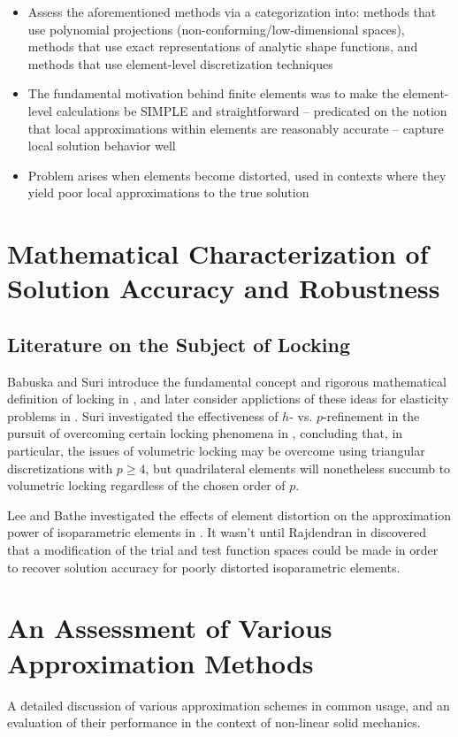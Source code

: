 \begin{itemize}
\begin{itemize}
	\end{itemize}
	\item Assess the aforementioned methods via a categorization into: methods that use polynomial projections (non-conforming/low-dimensional spaces), methods that use exact representations of analytic shape functions, and methods that use element-level discretization techniques
	\item The fundamental motivation behind finite elements was to make the element-level calculations be SIMPLE and straightforward -- predicated on the notion that local approximations within elements are reasonably accurate -- capture local solution behavior well
	\item Problem arises when elements become distorted, used in contexts where they yield poor local approximations to the true solution
\end{itemize}

\section{Mathematical Characterization of Solution Accuracy and Robustness}

\subsection{Literature on the Subject of Locking}

Babuska and Suri introduce the fundamental concept and rigorous mathematical definition of locking in \cite{Babuska&Suri:92:1}, and later consider applictions of these ideas for elasticity problems in \cite{Babuska&Suri:92:2}. Suri investigated the effectiveness of $h$- vs. $p$-refinement in the pursuit of overcoming certain locking phenomena in \cite{Suri:91}, concluding that, in particular, the issues of volumetric locking may be overcome using triangular discretizations with $p \geq 4$, but quadrilateral elements will nonetheless succumb to volumetric locking regardless of the chosen order of $p$.

Lee and Bathe investigated the effects of element distortion on the approximation power of isoparametric elements in \cite{Lee&Bathe:93}. It wasn't until Rajdendran in \cite{Rajendran:10} discovered that a modification of the trial and test function spaces could be made in order to recover solution accuracy for poorly distorted isoparametric elements.

\section{An Assessment of Various Approximation Methods}
%
A detailed discussion of various approximation schemes in common usage, and an evaluation of their performance in the context of non-linear solid mechanics.
